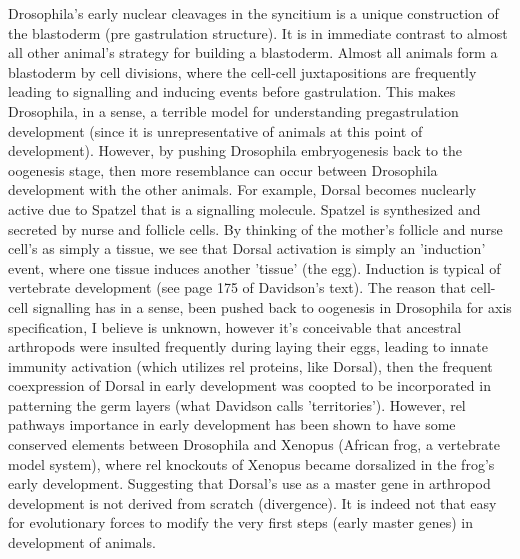   Drosophila's early nuclear cleavages in the syncitium is a unique construction of the blastoderm (pre gastrulation structure).  It is in immediate contrast to almost all other animal's strategy for building a blastoderm.  Almost all animals form a blastoderm by cell divisions, where the cell-cell juxtapositions are frequently leading to signalling and inducing events before gastrulation.  This makes Drosophila, in a sense, a terrible model for understanding pregastrulation development (since it is unrepresentative of animals at this point of development).  However, by pushing Drosophila embryogenesis back to the oogenesis stage, then more resemblance can occur between Drosophila development with the other animals.  For example, Dorsal becomes nuclearly active due to Spatzel that is a signalling molecule.  Spatzel is synthesized and secreted by nurse and follicle cells.  By thinking of the mother's follicle and nurse cell's as simply a tissue, we see that Dorsal activation is simply an 'induction' event, where one tissue induces another 'tissue' (the egg).  Induction is typical of vertebrate development (see page 175 of Davidson's text\cite{Davidson2006}).  The reason that cell-cell signalling has in a sense, been pushed back to oogenesis in Drosophila for axis specification, I believe is unknown, however it's conceivable that ancestral arthropods were insulted frequently during laying their eggs, leading to innate immunity activation (which utilizes rel proteins, like Dorsal), then the frequent coexpression of Dorsal in early development was coopted to be incorporated in patterning the germ layers (what Davidson calls 'territories').  However, rel pathways importance in early development has been shown to have some conserved elements between Drosophila and Xenopus (African frog, a vertebrate model system), where rel knockouts of Xenopus became dorsalized\cite{pmid9507077} in the frog's early development.  Suggesting that Dorsal's use as a master gene in arthropod development is not derived from scratch (divergence).  It is indeed not that easy for evolutionary forces to modify the very first steps (early master genes) in development of animals.    

